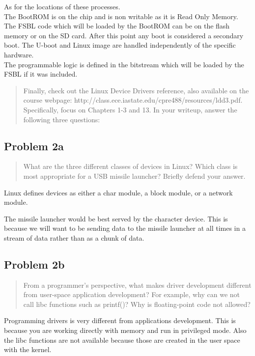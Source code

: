 \documentclass[10pt,a4paper]{article}
\let\oldsubsection\subsection
\renewcommand{\subsection}{%
    \setcounter{equation}{0}%
    \oldsubsection%
}
\begin{document}
As for the locations of these processes.\\
The BootROM is on the chip and is non writable as it is Read Only Memory.
The FSBL code which will be loaded by the BootROM can be on the flash memory or on the SD card.
After this point any boot is considered a secondary boot. The U-boot and Linux image are handled independently of the specific hardware.\\

The programmable logic is defined in the bitstream which will be loaded by the FSBL if it was included.

\begin{quote}
Finally, check out the Linux Device Drivers reference, also available on the course webpage:
http://class.ece.iastate.edu/cpre488/resources/ldd3.pdf. Specifically, focus on Chapters 1-3 and 13. In your
writeup, answer the following three questions:
\end{quote}

\subsection{Problem 2a}\begin{quote}

What are the three different classes of devices in Linux? Which class is most appropriate for a USB
missile launcher? Briefly defend your answer.
\end{quote}

Linux defines devices as either a char module, a block module, or a network module.

The missile launcher would be best served by the character device. This is because we will want to be sending data to the missile launcher at all times in a stream of data rather than as a chunk of data.

\subsection{Problem 2b}\begin{quote}
From a programmer’s perspective, what makes driver development different from user-space
application development? For example, why can we not call libc functions such as printf()? Why is
floating-point code not allowed?
\end{quote}

Programming drivers is very different from applications development. This is because you are working directly with memory and run in privileged mode. Also the libc functions are not available because those are created in the user space with the kernel.
\end{document}

